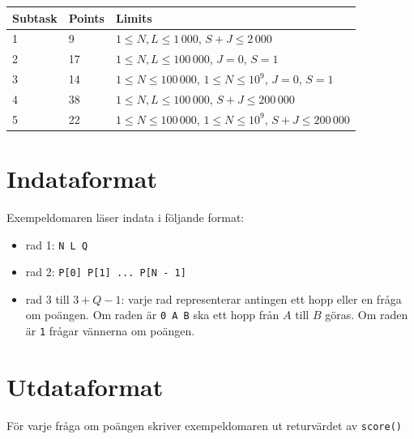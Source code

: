 \begin{tabular}{|l|l|l|}
  \hline
  \textbf{Subtask} & \textbf{Points} & \textbf{Limits} \\ \hline
  1 & 9 & $1 \le N, L \le 1\,000$,  $S + J \le 2\,000$ \\ \hline
  2 & 17 & $1 \le N, L \le 100\,000$, $J = 0$, $S = 1$ \\ \hline
  3 & 14 & $1 \le N \le 100\,000$, $1 \le N \le 10^9$, $J = 0$, $S = 1$ \\ \hline
  4 & 38 & $1 \le N, L \le 100\,000$, $S + J \le 200\,000$ \\ \hline
  5 & 22 & $1 \le N \le 100\,000$, $1 \le N \le 10^9$, $S + J \le 200\,000$ \\ \hline
\end{tabular}

\section*{Indataformat}
Exempeldomaren läser indata i följande format:

\begin{itemize}
  \item rad 1: \texttt{N L Q}
  \item rad 2: \texttt{P[0] P[1] ... P[N - 1]}
  \item rad $3$ till $3 + Q - 1$: varje rad representerar antingen ett hopp eller en fråga om poängen.
    Om raden är \texttt{0 A B} ska ett hopp från $A$ till $B$ göras. Om raden är \texttt{1} frågar vännerna om poängen.
\end{itemize}

\section*{Utdataformat}
För varje fråga om poängen skriver exempeldomaren ut returvärdet av \texttt{score()}
